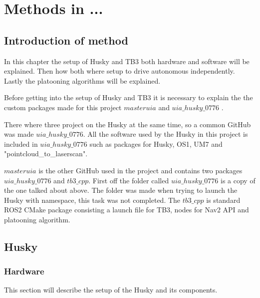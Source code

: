 \chapter{Methods in ...}

\section{Introduction of method}
In this chapter the setup of Husky and TB3 both hardware and software will be explained. Then how both where setup to drive autonomous independently. Lastly the platooning algorithms will be explained. 


Before getting into the setup of Husky and TB3 it is necessary to explain the the custom packages made for this project $masteruia$ \cite{masteruia} and $uia\_husky\_0776$ \cite{uiahusky}. 

There where three project on the Husky at the same time, so a common GitHub was made $uia\_husky\_0776$. All the software used by the Husky in this project is included in $uia\_husky\_0776$ such as packages for Husky, OS1, UM7 and "pointcloud\_to\_laserscan".

$masteruia$ is the other GitHub used in the project and contains two packages $uia\_husky\_0776$ and $tb3\_cpp$.
First off the folder called $uia\_husky\_0776$ is a copy of the one talked about above. The folder was made when trying to launch the Husky with namespace, this task was not completed. 
The $tb3\_cpp$ is standard ROS2 CMake package consisting a launch file for TB3, nodes for Nav2 API and platooning algorithm. 
                      

\section{Husky}
\subsection{Hardware}
This section will describe the setup of the Husky and its components. 

